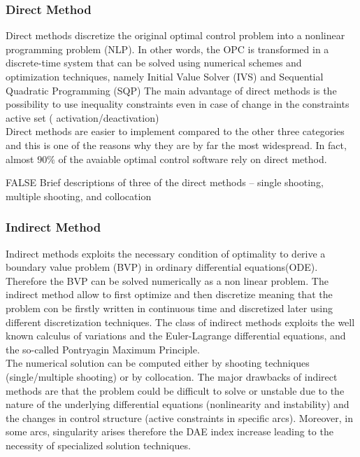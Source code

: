 \subsubsection{Direct Method}

Direct methods discretize the original optimal control problem into a  nonlinear programming problem (NLP). In other words, the OPC is transformed in a discrete-time system that can be solved using numerical schemes and  optimization techniques, namely Initial Value Solver (IVS) and Sequential Quadratic Programming (SQP) \cite{bertolazzi2005symbolic}
The main advantage of direct methods is the possibility to use inequality constraints even in case of change in the constraints active set ( activation/deactivation)\cite{biral2016notes}\\
Direct methods are easier to implement compared to the other three categories and this is one of the reasons why they are by far the most widespread. In fact, almost $90\%$ of the avaiable optimal control software rely on direct method. \cite{rao2009survey}\cite{rodrigues2014optimal}

\if FALSE
Brief descriptions
of three of the direct methods – single shooting, multiple shooting, and collocation
\fi

% 



\subsubsection{Indirect Method}

Indirect methods exploits the necessary condition of optimality to derive a boundary value problem (BVP) in ordinary differential equations(ODE). Therefore the BVP can be solved numerically as a non linear problem. The indirect method allow to first optimize and then discretize meaning that the problem con be firstly written in continuous time and discretized later using different discretization techniques.
The class of indirect methods exploits the well known calculus of variations
and the Euler-Lagrange differential equations, and the so-called Pontryagin
Maximum Principle.\cite{bertolazzi2006symbolic} \\
The numerical solution can be computed either by shooting techniques (single/multiple shooting) or by collocation.
The major drawbacks of indirect methods are that the problem could be difficult to solve or unstable due to the nature of the underlying differential equations (nonlinearity and instability) and the changes in control structure (active constraints in specific arcs). Moreover, in some arcs, singularity arises therefore the DAE index increase leading to the necessity of specialized solution techniques. \cite{biral2016notes}


